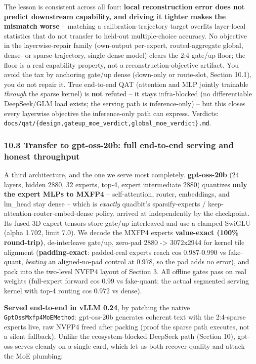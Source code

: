 \documentclass[
]{article}
\begin{document}
The lesson is consistent across all four: \textbf{local reconstruction
error does not predict downstream capability, and driving it tighter
makes the mismatch worse} -- matching a calibration-trajectory target
overfits layer-local statistics that do not transfer to held-out
multiple-choice accuracy. No objective in the layerwise-repair family
(own-output per-expert, routed-aggregate global, dense- or
sparse-trajectory, single dense model) clears the 2:4 gate/up floor; the
floor is a real capability property, not a reconstruction-objective
artifact. You avoid the tax by anchoring gate/up dense (down-only or
route-slot, Section 10.1), you do not repair it. True end-to-end QAT
(attention and MLP jointly trainable \emph{through} the sparse kernel)
is \textbf{not} refuted -- it stays infra-blocked (no differentiable
DeepSeek/GLM load exists; the serving path is inference-only) -- but
this closes every layerwise objective the inference-only path can
express. Verdicts:
\texttt{docs/qat/\{design,gateup\_moe\_verdict,global\_moe\_verdict\}.md}.

\subsubsection{10.3 Transfer to gpt-oss-20b: full end-to-end serving and
honest
throughput}\label{transfer-to-gpt-oss-20b-full-end-to-end-serving-and-honest-throughput}

A third architecture, and the one we serve most completely.
\textbf{gpt-oss-20b} (24 layers, hidden 2880, 32 experts, top-4, expert
intermediate 2880) quantizes \textbf{only the expert MLPs to MXFP4} --
self-attention, router, embeddings, and lm\_head stay dense -- which is
\emph{exactly} quadbit's sparsify-experts /
keep-attention-router-embed-dense policy, arrived at independently by
the checkpoint. Its fused 3D expert tensors store gate/up interleaved
and use a clamped SwiGLU (alpha 1.702, limit 7.0). We decode the MXFP4
experts \textbf{value-exact (100\% round-trip)}, de-interleave gate/up,
zero-pad 2880 -\textgreater{} 3072x2944 for kernel tile alignment
(\textbf{padding-exact}: padded-real experts reach cos 0.987-0.990 vs
fake-quant, \emph{beating} an aligned-no-pad control at 0.978, so the
pad adds no error), and pack into the two-level NVFP4 layout of Section
3. All offline gates pass on real weights (full-expert forward cos 0.99
vs fake-quant; the actual segmented serving kernel with top-4 routing
cos 0.972 vs dense).

\textbf{Served end-to-end in vLLM 0.24}, by patching the native
\texttt{GptOssMxfp4MoEMethod}: gpt-oss-20b generates coherent text with
the 2:4-sparse experts live, raw NVFP4 freed after packing (proof the
sparse path executes, not a silent fallback). Unlike the
ecosystem-blocked DeepSeek path (Section 10), gpt-oss serves cleanly on
a single card, which let us both recover quality and attack the MoE
plumbing:
\end{document}
